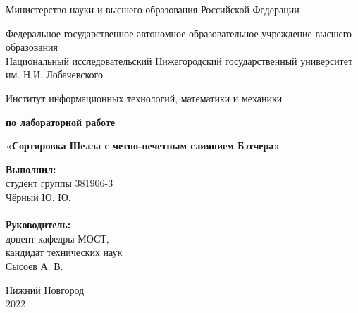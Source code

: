 \documentclass{report}
\begin{document}
\begin{titlepage}

\begin{center}
Министерство науки и высшего образования Российской Федерации
\end{center}

\begin{center}
Федеральное государственное автономное образовательное учреждение высшего образования \\
Национальный исследовательский Нижегородский государственный университет им. Н.И. Лобачевского
\end{center}

\begin{center}
Институт информационных технологий, математики и механики
\end{center}

\vspace{4em}

\begin{center}
\textbf{ по лабораторной работе} \\
\end{center}
\begin{center}
\textbf{\Large«Сортировка Шелла с четно-нечетным слиянием Бэтчера»} \\
\end{center}

\vspace{4em}

\newbox{\lbox}
\newlength{\maxl}
\setlength{\maxl}{\wd\lbox}
\hfill\parbox{7cm}{
\hspace*{5cm}\hspace*{-5cm}\textbf{Выполнил:} \\ студент группы 381906-3 \\ Чёрный Ю. Ю.\\
\\
\hspace*{5cm}\hspace*{-5cm}\textbf{Руководитель:}\\ доцент кафедры МОСТ, \\ кандидат технических наук \\ Сысоев А. В.\\
}
\vspace{\fill}

\begin{center} Нижний Новгород \\ 2022 \end{center}

\end{titlepage}
\end{document}
